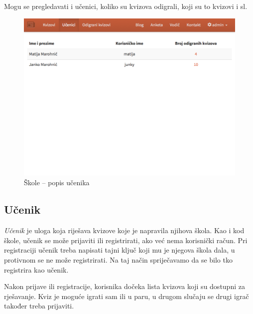 \documentclass{scrreprt}
\begin{document}
Mogu se pregledavati i učenici, koliko su kvizova odigrali, koji su to kvizovi i
sl.

\begin{figure}[H]
  \includegraphics[width=\textwidth, clip=true, trim=0 15cm 0 0, fbox]{school/students}
  \caption{Škole -- popis učenika}
\end{figure}

\subsection{Učenik}


\emph{Učenik} je uloga koja riješava kvizove koje je napravila njihova škola.
Kao i kod škole, učenik se može prijaviti ili registrirati, ako već nema
korisnički račun. Pri registraciji učenik treba napisati tajni ključ koji mu je
njegova škola dala, u protivnom se ne može registrirati. Na taj način
spriječavamo da se bilo tko registrira kao učenik.

Nakon prijave ili registracije, korisnika dočeka lista kvizova koji su dostupni
za rješavanje. Kviz je moguće igrati sam ili u paru, u drugom slučaju se drugi
igrač također treba prijaviti.
\end{document}
